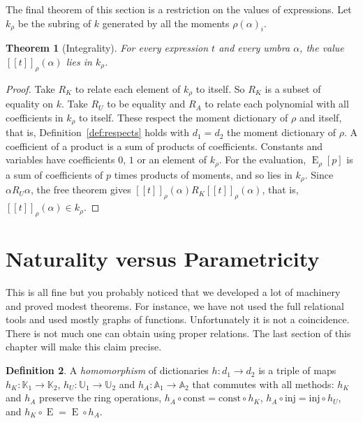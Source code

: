 \documentclass[11pt,a4paper]{report}
\theoremstyle{plain}
\newtheorem{theorem}{Theorem}[chapter]
\theoremstyle{definition}
\newtheorem{definition}[theorem]{Definition}
\theoremstyle{remark}
\newcommand{\E}{\operatorname{E}}
\newcommand{\sK}{\mathbb{K}}
\newcommand{\sU}{\mathbb{U}}
\newcommand{\sA}{\mathbb{A}}
\newcommand{\den}[2]{[\![#1]\!]_{#2}}
\begin{document}
The final theorem of this section is a restriction on the values of expressions.
Let $k_\rho$ be the subring of $k$ generated by all the moments $\rho(\alpha)_i$.

\begin{theorem}[Integrality]
\label{thm:integral}
For every expression $t$ and every umbra $\alpha$, the value
$\den{t}{\rho}(\alpha)$ lies in $k_\rho$.
\end{theorem}

\begin{proof}
Take $R_K$ to relate each element of $k_\rho$ to itself. So $R_K$ is a subset of 
equality on $k$. Take $R_U$ to be equality and $R_A$ to relate each polynomial
with all coefficients in $k_\rho$ to itself. These respect the moment dictionary
of $\rho$ and itself, that is, Definition~\ref{def:respects} holds with $d_1 = d_2$
the moment dictionary of $\rho$. A coefficient of a product is a sum of products of coefficients.
Constants and variables have coefficients $0$, $1$ or an element of $k_\rho$. For
the evaluation, $\E_\rho[p]$ is a sum of coefficients of $p$ times products of
moments, and so lies in $k_\rho$. Since $\alpha \mathrel{R_U} \alpha$, the free
theorem gives $\den{t}{\rho}(\alpha) \mathrel{R_K} \den{t}{\rho}(\alpha)$, that
is, $\den{t}{\rho}(\alpha) \in k_\rho$.
\end{proof}

\section{Naturality versus Parametricity}
\label{sec:naturality}

This is all fine but you probably noticed that we developed a lot of machinery 
and proved modest theorems. For instance, we have not used the full relational
tools and used mostly graphs of functions. Unfortunately it is not a coincidence. 
There is not much one can obtain using proper relations. The last section of this
chapter will make this claim precise.

\begin{definition}
\label{def:hom}
A \emph{homomorphism} of dictionaries $h : d_1 \to d_2$ is a triple of maps
$h_K : \sK_1 \to \sK_2$, $h_U : \sU_1 \to \sU_2$ and $h_A : \sA_1 \to \sA_2$ that commutes
with all methods: $h_K$ and $h_A$ preserve the ring operations,
$h_A \circ \mathrm{const} = \mathrm{const} \circ h_K$,
$h_A \circ \mathrm{inj} = \mathrm{inj} \circ h_U$, and
$h_K \circ \E = \E \circ h_A$.
\end{definition}
\end{document}
